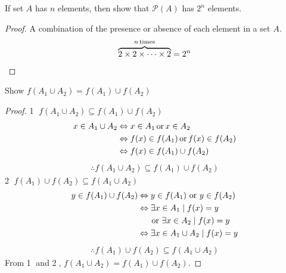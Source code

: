 \documentclass[12pt]{article}
\theoremstyle{definition}
\newenvironment{problem}[2][Problem]{\begin{trivlist}
    \item[\hskip \labelsep {\bfseries #1}\hskip \labelsep {\bfseries #2.}]}{\end{trivlist}}
\newcommand{\textop}[1]{\relax\ifmmode\mathop{\text{#1}}\else\text{#1}\fi} %
\begin{document}
\begin{problem}{4}
    If set $A$ has $n$ elements, then show that $\mathcal{P}(A)$ has $2^n$ elements.
\end{problem}
\begin{proof}
    A combination of the presence or absence of each element in a set $A$. \\
    \begin{align*}
        \overbrace{2 \times 2 \times \cdots \times 2}^{n \textop{times}} = 2^n
    \end{align*}
\end{proof}

\begin{problem}{5}
    Show $f(A_1 \cup A_2) = f(A_1) \cup f(A_2)$
\end{problem}
\begin{proof}
    \textcircled{1} $f(A_1 \cup A_2) \subseteq f(A_1) \cup f(A_2)$
    \begin{align}
        x \in A_1 \cup A_2 & \Leftrightarrow x \in A_1 \textop{or} x \in A_2 \\
        & \Leftrightarrow f(x) \in f(A_1) \textop{or} f(x) \in f(A_2) \\
        & \Leftrightarrow f(x) \in f(A_1) \cup f(A_2) 
    \end{align}
    \begin{align*}
        \therefore f(A_1 \cup A_2) \subseteq f(A_1) \cup f(A_2)
    \end{align*}
    \textcircled{2} $f(A_1) \cup f(A_2) \subseteq f(A_1 \cup A_2)$
    \begin{align}
        y \in f(A_1) \cup f(A_2) & \Leftrightarrow y \in f(A_1) \text{ or } y \in f(A_2) \\
        & \Leftrightarrow \exists x \in A_1 \mid f(x)=y \\
        & \ \ \ \ \text{ or } \exists x \in A_2 \mid f(x)=y \notag \\
        & \Leftrightarrow \exists x \in A_1 \cup A_2 \mid f(x)=y
    \end{align}
    \begin{align*}
        \therefore f(A_1) \cup f(A_2) \subseteq f(A_1 \cup A_2)
    \end{align*}
    From \textcircled{1} and \textcircled{2}, $f(A_1 \cup A_2) = f(A_1) \cup f(A_2)$.
\end{proof}
\end{document}
